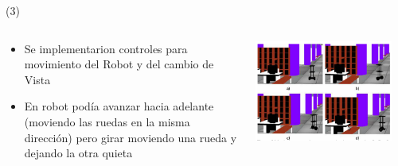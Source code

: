 \begin{frame}{ (3)}
\begin{columns}
\begin{column}{0.48\textwidth}
    \begin{center}

\begin{itemize}
\item Se implementarion controles para movimiento del Robot y del cambio de Vista
\item En robot podía avanzar hacia adelante (moviendo las ruedas en la misma dirección) pero girar moviendo una rueda y dejando la otra quieta
\end{itemize}
     \end{center}

\end{column}
\begin{column}{0.52\textwidth}  
    \begin{center}
\begin{itemize}
\end{itemize}
     \includegraphics[width=0.9\textwidth]{Figs/SerbotI_D}\\
     \end{center}
\end{column}
\end{columns}
\end{frame}
